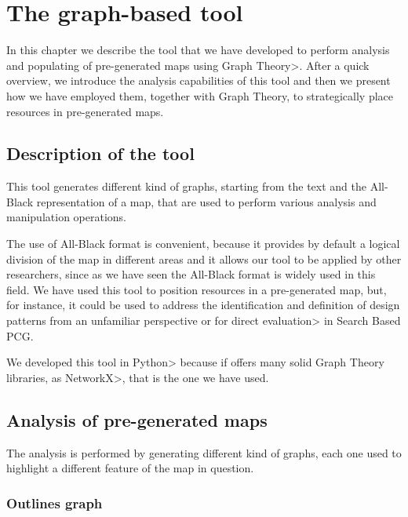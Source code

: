\chapter{The graph-based tool}


In this chapter we describe the tool that we have developed to perform analysis and populating of pre-generated maps using \<Graph Theory>. After a quick overview, we introduce the analysis capabilities of this tool and then we present how we have employed them, together with Graph Theory, to strategically place resources in pre-generated maps.


\section{Description of the tool}

This tool generates different kind of graphs, starting from the text and the All-Black representation of a map, that are used to perform various analysis and manipulation operations.

\par

The use of All-Black format is convenient, because it provides by default a logical division of the map in different areas and it allows our tool to be applied by other researchers, since as we have seen the All-Black format is widely used in this field. We have used this tool to position resources in a pre-generated map, but, for instance, it could be used to address the identification and definition of design patterns from an unfamiliar perspective or for \<direct evaluation> in Search Based PCG.

\par 

We developed this tool in \<Python> because if offers many solid Graph Theory libraries, as \<NetworkX>, that is the one we have used.


\section{Analysis of pre-generated maps}

The analysis is performed by generating different kind of graphs, each one used to highlight a different feature of the map in question.

\subsection{Outlines graph}

